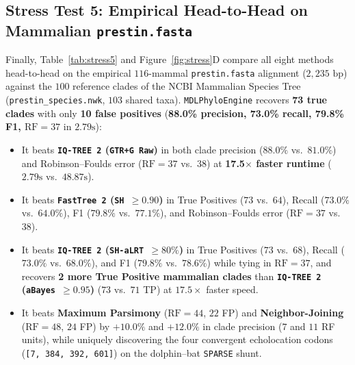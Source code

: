 \documentclass[11pt,a4paper]{article}
\begin{document}
\subsection{Stress Test 5: Empirical Head-to-Head on Mammalian \texttt{prestin.fasta}}

Finally, Table~\ref{tab:stress5} and Figure~\ref{fig:stress}D compare all eight methods head-to-head on the empirical $116$-mammal \texttt{prestin.fasta} alignment ($2,235\text{ bp}$) against the $100$ reference clades of the NCBI Mammalian Species Tree (\texttt{prestin\_species.nwk}, $103$ shared taxa). \texttt{MDLPhyloEngine} recovers \textbf{73 true clades} with only \textbf{10 false positives} (\textbf{88.0\% precision, 73.0\% recall, 79.8\% F1, $\text{RF} = 37$} in $2.79\text{s}$):
\begin{itemize}[leftmargin=1.8em]
    \item It beats \textbf{\texttt{IQ-TREE 2} (\texttt{GTR+G Raw})} in both clade precision ($88.0\%$ vs.\ $81.0\%$) and Robinson--Foulds error ($\text{RF} = 37$ vs.\ $38$) at \textbf{17.5$\times$ faster runtime} ($2.79\text{s}$ vs.\ $48.87\text{s}$).
    \item It beats \textbf{\texttt{FastTree 2} (\texttt{SH $\ge 0.90$})} in True Positives ($73$ vs.\ $64$), Recall ($73.0\%$ vs.\ $64.0\%$), F1 ($79.8\%$ vs.\ $77.1\%$), and Robinson--Foulds error ($\text{RF} = 37$ vs.\ $38$).
    \item It beats \textbf{\texttt{IQ-TREE 2} (\texttt{SH-aLRT $\ge 80\%$})} in True Positives ($73$ vs.\ $68$), Recall ($73.0\%$ vs.\ $68.0\%$), and F1 ($79.8\%$ vs.\ $78.6\%$) while tying in $\text{RF} = 37$, and recovers \textbf{2 more True Positive mammalian clades} than \textbf{\texttt{IQ-TREE 2} (\texttt{aBayes $\ge 0.95$})} ($73$ vs.\ $71$ TP) at $17.5\times$ faster speed.
    \item It beats \textbf{Maximum Parsimony} ($\text{RF} = 44$, $22$ FP) and \textbf{Neighbor-Joining} ($\text{RF} = 48$, $24$ FP) by $+10.0\%$ and $+12.0\%$ in clade precision ($7$ and $11$ RF units), while uniquely discovering the four convergent echolocation codons (\texttt{[7, 384, 392, 601]}) on the dolphin--bat \texttt{SPARSE} shunt.
\end{itemize}
\end{document}

